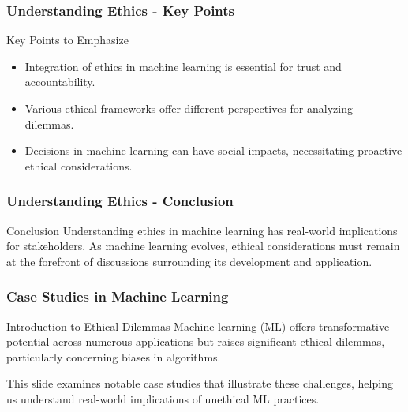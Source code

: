 \documentclass[aspectratio=169]{beamer}
\begin{document}
\begin{frame}[fragile]
    \frametitle{Understanding Ethics - Key Points}
    \begin{block}{Key Points to Emphasize}
        \begin{itemize}
            \item Integration of ethics in machine learning is essential for trust and accountability.
            \item Various ethical frameworks offer different perspectives for analyzing dilemmas.
            \item Decisions in machine learning can have social impacts, necessitating proactive ethical considerations.
        \end{itemize}
    \end{block}
\end{frame}

\begin{frame}[fragile]
    \frametitle{Understanding Ethics - Conclusion}
    \begin{block}{Conclusion}
        Understanding ethics in machine learning has real-world implications for stakeholders. As machine learning evolves, ethical considerations must remain at the forefront of discussions surrounding its development and application.
    \end{block}
\end{frame}

\begin{frame}[fragile]
    \frametitle{Case Studies in Machine Learning}
    \begin{block}{Introduction to Ethical Dilemmas}
        Machine learning (ML) offers transformative potential across numerous applications but raises significant ethical dilemmas, particularly concerning biases in algorithms.
    \end{block}
    This slide examines notable case studies that illustrate these challenges, helping us understand real-world implications of unethical ML practices.
\end{frame}
\end{document}
